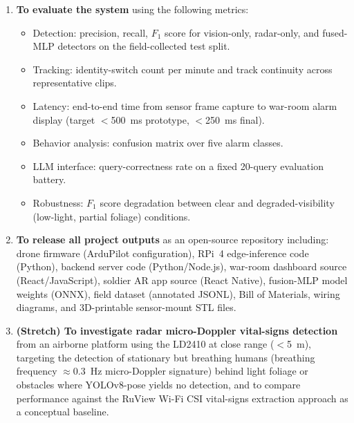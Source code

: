 \begin{enumerate}[label=\textbf{O\arabic*.}, leftmargin=*, itemsep=4pt]
    \item \textbf{To evaluate the system} using the following metrics:
    \begin{itemize}
        \item Detection: precision, recall, $F_1$ score for vision-only, radar-only, and fused-MLP detectors on the field-collected test split.
        \item Tracking: identity-switch count per minute and track continuity across representative clips.
        \item Latency: end-to-end time from sensor frame capture to war-room alarm display (target $<$500~ms prototype, $<$250~ms final).
        \item Behavior analysis: confusion matrix over five alarm classes.
        \item LLM interface: query-correctness rate on a fixed 20-query evaluation battery.
        \item Robustness: $F_1$ score degradation between clear and degraded-visibility (low-light, partial foliage) conditions.
    \end{itemize}

    \item \textbf{To release all project outputs} as an open-source repository including: drone firmware (ArduPilot configuration), RPi~4 edge-inference code (Python), backend server code (Python/Node.js), war-room dashboard source (React/JavaScript), soldier AR app source (React Native), fusion-MLP model weights (ONNX), field dataset (annotated JSONL), Bill of Materials, wiring diagrams, and 3D-printable sensor-mount STL files.

    \item[\textbf{O11.}] \textbf{(Stretch) To investigate radar micro-Doppler vital-signs detection} from an airborne platform using the LD2410 at close range ($<$5~m), targeting the detection of stationary but breathing humans (breathing frequency $\approx 0.3$~Hz micro-Doppler signature) behind light foliage or obstacles where YOLOv8-pose yields no detection, and to compare performance against the RuView Wi-Fi CSI vital-signs extraction approach as a conceptual baseline.

\end{enumerate}
